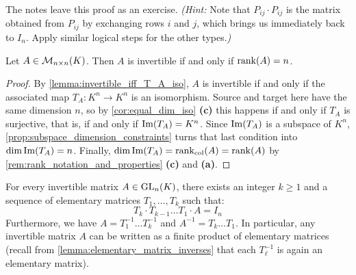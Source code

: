 \begin{exercise}
\label{exc:elementary_matrix_inverses}
The notes leave this proof as an exercise. \textit{(Hint:} Note that $P_{ij} \cdot P_{ij}$ is the matrix obtained from $P_{ij}$ by exchanging rows $i$ and $j$, which brings us immediately back to $I_n$. Apply similar logical steps for the other types.\textit{)}
\end{exercise}

\begin{aiproposition}
\label{aiprop:invertible_iff_full_rank}
Let $A \in \mathcal{M}_{n \times n}(K)$. Then $A$ is invertible if and only if $\operatorname{rank}(A) = n$.
\end{aiproposition}

\begin{proof}
By \cref{lemma:invertible_iff_T_A_iso}, $A$ is invertible if and only if the associated map $T_A: K^n \to K^n$ is an isomorphism. Source and target here have the same dimension $n$, so by \cref{cor:equal_dim_iso} \textbf{(c)} this happens if and only if $T_A$ is surjective, that is, if and only if $\operatorname{Im}(T_A) = K^n$. Since $\operatorname{Im}(T_A)$ is a subspace of $K^n$, \cref{prop:subspace_dimension_constraints} turns that last condition into $\dim \operatorname{Im}(T_A) = n$. Finally, $\dim \operatorname{Im}(T_A) = \operatorname{rank}_{\text{col}}(A) = \operatorname{rank}(A)$ by \cref{rem:rank_notation_and_properties} \textbf{(c)} and \textbf{(a)}.
\end{proof}

\begin{theorem}
\label{thm:elementary_matrix_decomposition}
For every invertible matrix $A \in \operatorname{GL}_n(K)$, there exists an integer $k \ge 1$ and a sequence of elementary matrices $T_1, \dots, T_k$ such that:
\begin{equation*}
    T_k \cdot T_{k-1} \dots T_1 \cdot A = I_n
\end{equation*}
Furthermore, we have $A = T_1^{-1} \dots T_k^{-1}$ and $A^{-1} = T_k \dots T_1$. In particular, any invertible matrix $A$ can be written as a finite product of elementary matrices (recall from \cref{lemma:elementary_matrix_inverses} that each $T_{\ell}^{-1}$ is again an elementary matrix).
\end{theorem}

